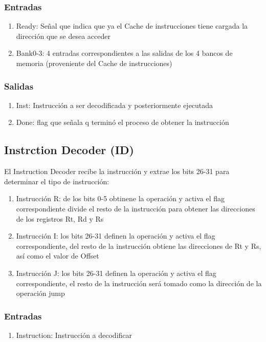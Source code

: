 \documentclass{article}
\begin{document}
            \subsubsection{Entradas}
            \begin{enumerate}
                \item Ready: Se\~nal que indica que ya el Cache de instrucciones tiene cargada la direcci\'on que se desea acceder
                \item Bank0-3: 4 entradas correspondientes a las salidas de los 4 bancos de memoria (proveniente del Cache de instrucciones)
            \end{enumerate}

            \subsubsection{Salidas}
            \begin{enumerate}
                \item Inst: Instrucci\'on a ser decodificada y posteriormente ejecutada
                \item Done: flag que se\~nala q termin\'o el proceso de obtener la instrucci\'on
            \end{enumerate}

        \subsection{Instrction Decoder (ID)}
        \label{sec:ID}
            El Instruction Decoder recibe la instrucci\'on y extrae los bits 26-31 para determinar el tipo de instrucci\'on:
            \begin{enumerate}
                \item Instrucci\'on R: de los bits 0-5 obtinene la operaci\'on y activa el flag correspondiente divide el resto de la instrucci\'on para obtener las direcciones de los registros Rt, Rd y Rs
                \item Instrucci\'on I: los bits 26-31 definen la operaci\'on y activa el flag correspondiente, del resto de la instrucci\'on obtiene las direcciones de Rt y Rs, as\'i como el valor de Offset
                \item Instrucci\'on J: los bits 26-31 definen la operaci\'on y activa el flag correspondiente, el resto de la instrucci\'on ser\'a tomado como la direcci\'on de la operaci\'on jump
            \end{enumerate}
            \subsubsection{Entradas}
            \begin{enumerate}
                \item Instruction: Instrucci\'on a decodificar
            \end{enumerate}
\end{document}
